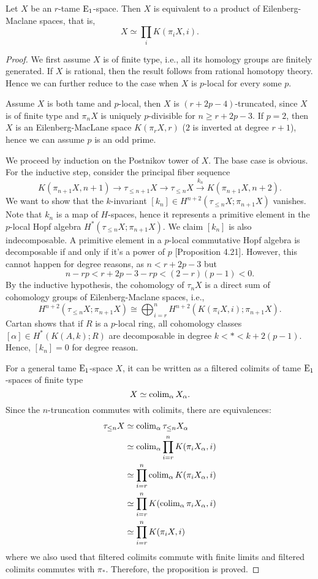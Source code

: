 \begin{proposition}
\label{Decomp of tame H-spaces}
	Let $X$ be an $r$-tame $\operatorname{E}_1$-space. Then $X$ is equivalent to a product of Eilenberg-Maclane spaces, that is, 
	\[
	X \simeq \prod_i K(\pi_i X, i).
	\]
\end{proposition}
\begin{proof}
We first assume $X$ is of finite type, i.e., all its homology groups are finitely generated. If $X$ is rational, then the result follows from rational homotopy theory. Hence we can further reduce to the case when $X$ is $p$-local for every some $p$.

Assume $X$ is both tame and $p$-local, then $X$ is $(r+2p-4)$-truncated, since $X$ is of finite type and  $\pi_{n}X$ is uniquely $p$-divisible for $n \geq r+2p-3$. If $p=2$, then $X$ is an Eilenberg-MacLane space $K(\pi_r X, r)$ ($2$ is inverted at degree $r+1$), hence we can assume $p$ is an odd prime. 

	We proceed by induction on the Postnikov tower of $X$.
	The base case is obvious. 	
	For the inductive step, consider the principal fiber sequence
	$$
	K(\pi_{n+1}X,n+1)\to 
	\tau_{\leq n+1}X
	\to
	\tau_{\leq n}X
	\xrightarrow{k_n}
	K(\pi_{n+1}X,n+2).
	$$
	We want to show that the $k$-invariant $[k_n]\in H^{n+2}(\tau_{\leq n}X; \pi_{n+1}X)$ vanishes. 
	Note that $k_n$ is a map of $H$-spaces, hence it represents a primitive element in the $p$-local Hopf algebra $H^*(\tau_{\leq n}X; \pi_{n+1}X)$. 
	We claim $[k_n]$ is also indecomposable.
	A primitive element in a $p$-local commutative Hopf algebra is decomposable if and only if it's a power of $p$ \cite{Milnor-Moore}[Proposition 4.21].
    However, this cannot happen for degree reasons, as
	$n<r+2p-3$ but
	\[
	n-rp<r+2p-3-rp< (2-r)(p-1)<0.
	\]
 	 By the inductive hypothesis, the cohomology of $\tau_n X$ is a direct sum of cohomology groups of Eilenberg-Maclane spaces, i.e., 
 	 $$
 	 H^{n+2}(\tau_{\leq n} X; \pi_{n+1}X)\cong
 	 \bigoplus_{i = r}^{n} H^{n+2}(K(\pi_i X, i); \pi_{n+1}X).
 	 $$
	 Cartan \cite{Cartan_I} shows that if $R$ is a $p$-local ring, all cohomology classes  $[\alpha]\in H^{*}(K(A,k);R)$ are decomposable in degree $k<*<k+2(p-1)$. Hence, $[k_n]=0$ for degree reason.
	 
	 For a general tame $\operatorname{E}_1$-space $X$, it can be written as a filtered colimits of tame $\operatorname{E}_1$-spaces of finite type
	 $$
	 X\simeq \operatorname{colim}_{\alpha} X_{\alpha}.
	 $$
	 Since the $n$-truncation commutes with colimits, there are equivalences:
	 \begin{align*}
	     \tau_{\leq n} X & \simeq \operatorname{colim}_{\alpha} \tau_{\leq n} X_{\alpha}\\
	     & \simeq \operatorname{colim}_{\alpha} \prod^{n}_{i=r}K(\pi_iX_{\alpha} , i)\\
	     & \simeq \prod^{n}_{i=r} \operatorname{colim}_{\alpha}K(\pi_{i}X_{\alpha},i)\\
	     & \simeq \prod^{n}_{i=r} K(\operatorname{colim}_{\alpha}\pi_{i}X_{\alpha},i)\\
	     & \simeq \prod^{n}_{i=r} K(\pi_{i}X,i)\\
	 \end{align*}
	 where we also used that filtered colimits commute with finite limits and filtered colimits commutes with $\pi_*$.
	 Therefore, the proposition is proved.
\end{proof}
